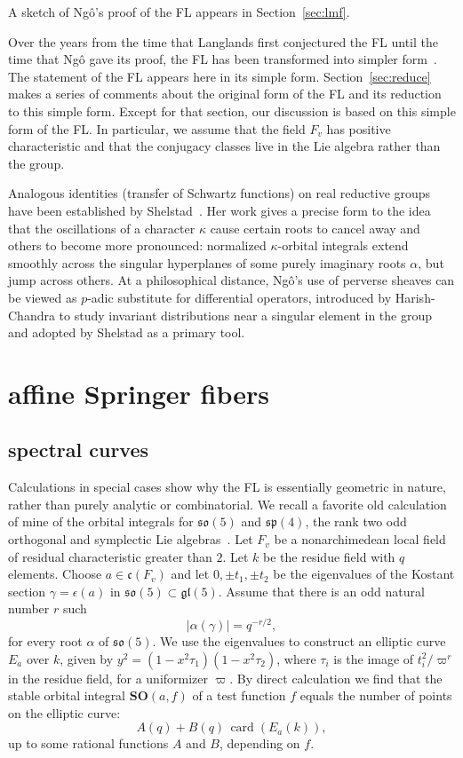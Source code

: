 \documentclass[brochure,english,12pt]{bourbaki}
\theoremstyle{plain}
\def\op#1{{\operatorname{#1}}}
\def\card{\op{card}}
\def\SO{{\mathbf {SO}}}
\def\so{\mathfrak{so}}
\def\sp{\mathfrak{sp}}
\def\gl{\mathfrak{gl}}
\def\cc{\mathfrak{c}}
\begin{document}
A sketch of Ng\^o's proof of the FL  appears in Section~\ref{sec:lmf}. 


Over the years from the time that Langlands first conjectured the FL
until the time that Ng\^o gave its proof, the FL has been transformed
into simpler form~\cite{Langlands:debuts}.  The statement of the FL
appears here in its simple form.  Section~\ref{sec:reduce} makes a
series of comments about the original form of the FL and its
reduction to this simple form.  Except for that section, our
discussion is based on this simple form of the FL.  In particular, we
assume that the field $F_v$ has positive characteristic and that the
conjugacy classes live in the Lie algebra rather than the group.

Analogous identities (transfer of Schwartz functions)
on real reductive groups have been established by 
Shelstad~\cite{Shelstad:OI}.  Her work gives a precise form to the
 idea that the oscillations of a character
$\kappa$ cause certain roots to cancel away and others to become more
pronounced: normalized $\kappa$-orbital integrals extend smoothly
across the singular hyperplanes of some purely imaginary roots $\alpha$,
but jump across others.  At a philosophical distance, Ng\^o's use of
perverse sheaves can be viewed as $p$-adic substitute for 
differential operators, introduced by Harish-Chandra to study
invariant distributions near a singular element in the group and
adopted by Shelstad as a primary tool.



\section{affine Springer fibers}

\subsection{spectral curves}

Calculations in special cases show why the FL is essentially geometric
in nature, rather than purely analytic or combinatorial. We recall a
favorite old calculation of mine of the orbital integrals for $\so(5)$
and $\sp(4)$, the rank two odd orthogonal and symplectic Lie
algebras~\cite{hyperelliptic-curves}.  Let $F_v$ be a nonarchimedean
local field of residual characteristic greater than $2$.  Let $k$ be
the residue field with $q$ elements.  Choose $a\in \cc(F_v)$  and let $0,\pm t_1,\pm t_2$ be
the eigenvalues of the Kostant section $\gamma=\epsilon(a)$ in $\so(5)\subset \gl(5)$.
Assume that there is an odd
natural number $r$ such
\[
|\alpha(\gamma)| = q^{-r/2},
\]
for every root $\alpha$ of $\so(5)$.  We use the eigenvalues to
construct an elliptic curve $E_a$ over $k$, given by $y^2 =
(1-x^2\tau_1)(1-x^2\tau_2)$, where $\tau_i$ is the image of
$t_i^2/\varpi^r$ in the residue field, for a uniformizer $\varpi$.  By
direct calculation we find that the stable orbital integral
$\SO(a,f)$ of a test function $f$ equals the number of points on the
elliptic curve:
\begin{equation}\label{eqn:elliptic}
A(q) + B(q)\, \card( E_a(k)),
\end{equation}
up to some rational functions $A$ and $B$, depending on $f$.
\end{document}
